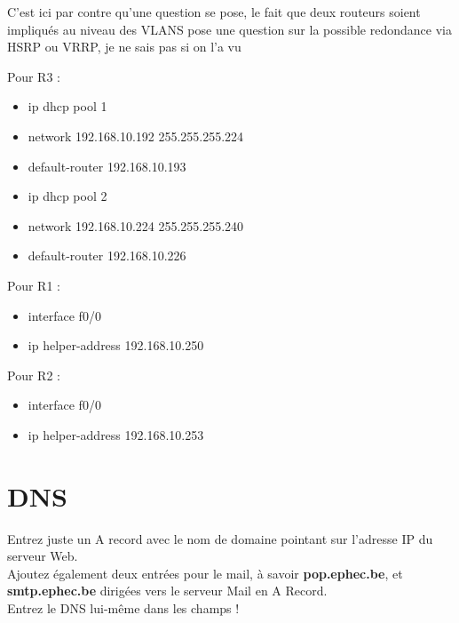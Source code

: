 \documentclass[a4paper,10pt,final,fleqn]{article}
\begin{document}
	C'est ici par contre qu'une question se pose, le fait que deux routeurs soient impliqués au niveau des VLANS pose une question sur la possible redondance via HSRP ou VRRP, je ne sais pas si on l'a vu

	Pour R3 : \\

	\begin{itemize}
		\item ip dhcp pool 1
		\item network 192.168.10.192 255.255.255.224
		\item default-router 192.168.10.193
		\item ip dhcp pool 2
		\item network 192.168.10.224 255.255.255.240
		\item default-router 192.168.10.226\\
	\end{itemize}

	Pour R1 : \\

	\begin{itemize}
		\item interface f0/0
		\item ip helper-address 192.168.10.250\\
	\end{itemize}

	Pour R2 : \\

	\begin{itemize}
		\item interface f0/0
		\item ip helper-address 192.168.10.253\\
	\end{itemize}


\section{DNS}

	Entrez juste un A record avec le nom de domaine pointant sur l'adresse IP du serveur Web.\\

	Ajoutez également deux entrées pour le mail, à savoir \textbf{pop.ephec.be}, et \textbf{smtp.ephec.be} dirigées vers le serveur Mail en A Record.\\

	Entrez le DNS lui-même dans les champs ! \\
\end{document}
